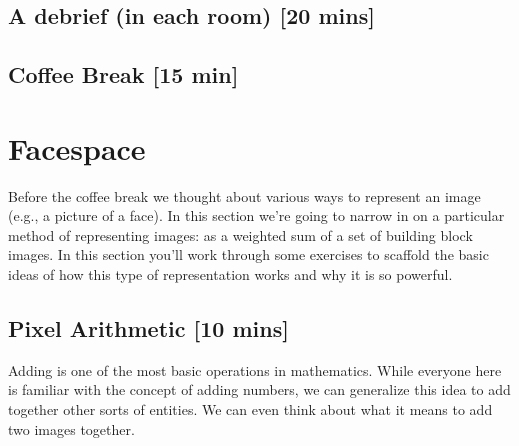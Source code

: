 \subsection{A debrief (in each room) [20 mins]}

\subsection{Coffee Break [15 min]}

\section{Facespace}

Before the coffee break we thought about various ways to represent an image (e.g., a picture of a face).  In this section we're going to narrow in on a particular method of representing images: as a weighted sum of a set of building block images.  In this section you'll work through some exercises to scaffold the basic ideas of how this type of representation works and why it is so powerful.

\subsection{Pixel Arithmetic [10 mins]}
Adding is one of the most basic operations in mathematics.  While everyone here is familiar with the concept of adding numbers, we can generalize this idea to add together other sorts of entities.  We can even think about what it means to add two images together.

